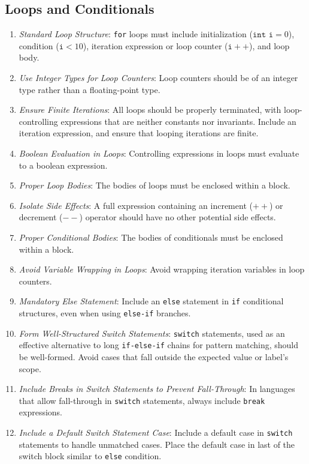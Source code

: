\documentclass[9pt]{IEEEtran} %
\begin{document}
\subsection{Loops and Conditionals}
\label{ESSLoops}

\begin{enumerate}
  \item \textit{Standard Loop Structure}: \texttt{for} loops must include initialization ($\texttt{int i} = 0$), condition ($\texttt{i} < 10$), iteration expression  or loop counter ($\texttt{i}++$), and loop body.
  \item \textit{Use Integer Types for Loop Counters}: Loop counters should be of an integer type rather than a floating-point type.
  \item \textit{Ensure Finite Iterations}: All loops should be properly terminated, with loop-controlling expressions that are neither constants nor invariants. Include an iteration expression, and ensure that looping iterations are finite. 
  \item \textit{Boolean Evaluation in Loops}: Controlling expressions in loops must evaluate to a boolean expression.
  \item \textit{Proper Loop Bodies}: The bodies of loops must be enclosed within a block.
  \item \textit{Isolate Side Effects}: A full expression containing an increment ($++$) or decrement ($--$) operator should have no other potential side effects.
  \item \textit{Proper Conditional Bodies}: The bodies of conditionals must be enclosed within a block.
  \item \textit{Avoid Variable Wrapping in Loops}: Avoid wrapping iteration variables in loop counters.
  \item \textit{Mandatory Else Statement}: Include an \texttt{else} statement in \texttt{if} conditional structures, even when using \texttt{else-if} branches.
  \item \textit{Form Well-Structured Switch Statements}: \texttt{switch} statements, used as an effective alternative to long \texttt{if-else-if} chains for pattern matching, should be well-formed. Avoid cases that fall outside the expected value or label’s scope. 
  \item \textit{Include Breaks in Switch Statements to Prevent Fall-Through}: In languages that allow fall-through in \texttt{switch} statements, always include \texttt{break} expressions. 
  \item \textit{Include a Default Switch Statement Case}: Include a default case in \texttt{switch} statements to handle unmatched cases. Place the default case in last of the switch block similar to \texttt{else} condition.

\end{enumerate}
\end{document}
